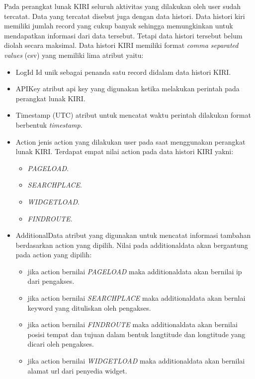 Pada perangkat lunak KIRI seluruh aktivitas yang dilakukan oleh user sudah tercatat. Data yang tercatat disebut juga dengan data histori. Data histori kiri memiliki jumlah record yang cukup banyak sehingga memungkinkan untuk mendapatkan informasi dari data tersebut. Tetapi data histori tersebut belum diolah secara maksimal. Data histori KIRI memiliki format \textit{comma separated values} (csv) yang memiliki lima atribut yaitu:
\begin{itemize}
    \item LogId
    Id unik  sebagai penanda satu record didalam data histori KIRI.
    \item APIKey
     atribut api key yang digunakan ketika melakukan perintah pada perangkat lunak KIRI.
    \item Timestamp (UTC)
    atribut untuk mencatat waktu perintah dilakukan format berbentuk \textit{timestamp}.
    \item Action
    jenis action yang dilakukan user pada saat menggunakan perangkat lunak KIRI. Terdapat empat nilai action pada data histori KIRI yakni:
    \begin{itemize}
        \item \textit{PAGELOAD}.
        \item \textit{SEARCHPLACE}.
        \item \textit{WIDGETLOAD}.
        \item \textit{FINDROUTE}.
    \end{itemize}
    \item AdditionalData atribut yang digunakan untuk mencatat informasi tambahan berdasarkan action yang dipilih. Nilai pada additionaldata akan bergantung pada action yang dipilih:
    \begin{itemize}
        \item jika action bernilai \textit{PAGELOAD} maka additionaldata akan bernilai ip dari pengakses.
        \item jika action bernilai \textit{SEARCHPLACE} maka additionaldata akan bernlai keyword yang dituliskan oleh pengakses.
        \item jika action bernilai \textit{FINDROUTE} maka additionaldata akan bernilai posisi tempat dan tujuan dalam bentuk langtitude dan longtitude  yang dicari oleh pengakses.
        \item jika action bernilai \textit{WIDGETLOAD} maka additionaldata akan bernilai alamat url dari penyedia widget.
    \end{itemize}
\end{itemize}

